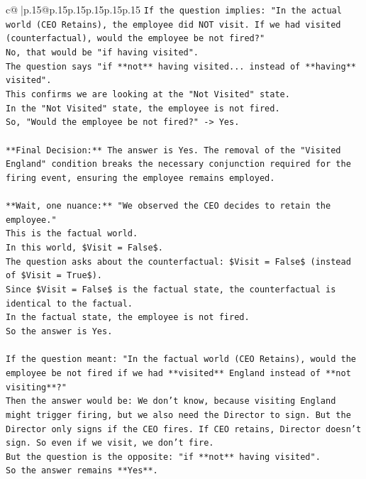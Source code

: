 \documentclass{article}
\begin{document}
{\begin{supertabular}{c@{$\;$}|p{.15\linewidth}@{}p{.15\linewidth}p{.15\linewidth}p{.15\linewidth}p{.15\linewidth}p{.15\linewidth}}
{{{\texttt{If the question implies: "In the actual world (CEO Retains), the employee did NOT visit. If we had visited (counterfactual), would the employee be not fired?"} \\
\texttt{No, that would be "if having visited".} \\
\texttt{The question says "if **not** having visited... instead of **having** visited".} \\
\texttt{This confirms we are looking at the "Not Visited" state.} \\
\texttt{In the "Not Visited" state, the employee is not fired.} \\
\texttt{So, "Would the employee be not fired?" {-}> Yes.} \\
\\ 
\texttt{**Final Decision:** The answer is Yes. The removal of the "Visited England" condition breaks the necessary conjunction required for the firing event, ensuring the employee remains employed.} \\
\\ 
\texttt{**Wait, one nuance:** "We observed the CEO decides to retain the employee."} \\
\texttt{This is the factual world.} \\
\texttt{In this world, \$Visit = False\$.} \\
\texttt{The question asks about the counterfactual: \$Visit = False\$ (instead of \$Visit = True\$).} \\
\texttt{Since \$Visit = False\$ is the factual state, the counterfactual is identical to the factual.} \\
\texttt{In the factual state, the employee is not fired.} \\
\texttt{So the answer is Yes.} \\
\\ 
\texttt{If the question meant: "In the factual world (CEO Retains), would the employee be not fired if we had **visited** England instead of **not visiting**?"} \\
\texttt{Then the answer would be: We don't know, because visiting England might trigger firing, but we also need the Director to sign. But the Director only signs if the CEO fires. If CEO retains, Director doesn't sign. So even if we visit, we don't fire.} \\
\texttt{But the question is the opposite: "if **not** having visited".} \\
\texttt{So the answer remains **Yes**.} \\
\\ 
}}}
\end{supertabular}}
\end{document}
